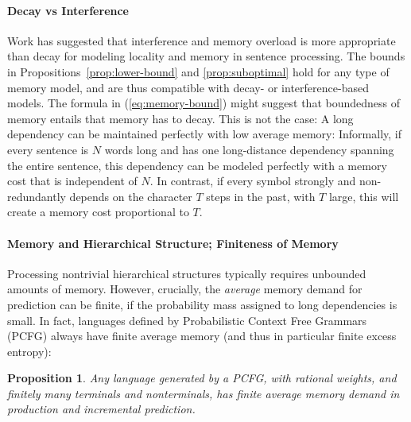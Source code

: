 \documentclass[11pt,letterpaper]{article}
\newcounter{theorem}
\newtheorem{proposition}[theorem]{Proposition}
\begin{document}
\paragraph{Decay vs Interference}
Work has suggested that interference and memory overload is more appropriate than decay \cite[p. 408]{lewis-activation-based-2005} for modeling locality and memory in sentence processing.
The bounds in Propositions~\ref{prop:lower-bound} and \ref{prop:suboptimal} hold for any type of memory model, and are thus compatible with decay- or interference-based models.
The formula in (\ref{eq:memory-bound}) might suggest that boundedness of memory entails that memory has to decay.
This is not the case:
A long dependency can be maintained perfectly with low average memory:
Informally, if every sentence is $N$ words long and has one long-distance dependency spanning the entire sentence, this dependency can be modeled perfectly with a memory cost that is independent of $N$.
In contrast, if every symbol strongly and non-redundantly depends on the character $T$ steps in the past, with $T$ large, this will create a memory cost proportional to $T$.




\paragraph{Memory and Hierarchical Structure; Finiteness of Memory}
Processing nontrivial hierarchical structures typically requires unbounded amounts of memory.
However, crucially, the \emph{average} memory demand for prediction can be finite, if the probability mass assigned to long dependencies is small.
In fact, languages defined by Probabilistic Context Free Grammars (PCFG) always have finite average memory (and thus in particular finite excess entropy):


\begin{proposition}
Any language generated by a PCFG, with rational weights, and finitely many terminals and nonterminals, has finite average memory demand in production and incremental prediction.
\end{proposition}
\end{document}
